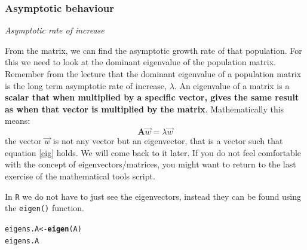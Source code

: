 \documentclass{article}\usepackage[]{graphicx}\usepackage[]{color}
\makeatletter
\newcommand{\hlstd}[1]{\textcolor[rgb]{0.345,0.345,0.345}{#1}}%
\newcommand{\hlkwb}[1]{\textcolor[rgb]{0.69,0.353,0.396}{#1}}%
\newcommand{\hlkwd}[1]{\textcolor[rgb]{0.737,0.353,0.396}{\textbf{#1}}}%
\newenvironment{kframe}{%
 \def\at@end@of@kframe{}%
 \ifinner\ifhmode%
  \def\at@end@of@kframe{\end{minipage}}%
  \begin{minipage}{\columnwidth}%
 \fi\fi%
 \def\FrameCommand##1{\hskip\@totalleftmargin \hskip-\fboxsep
 \colorbox{shadecolor}{##1}\hskip-\fboxsep
     \hskip-\linewidth \hskip-\@totalleftmargin \hskip\columnwidth}%
 \MakeFramed {\advance\hsize-\width
   \@totalleftmargin\z@ \linewidth\hsize
   \@setminipage}}%
 {\par\unskip\endMakeFramed%
 \at@end@of@kframe}
\newenvironment{knitrout}{}{} %
\makeatother
\begin{document}
\subsubsection{Asymptotic behaviour}
\textit{Asymptotic rate of increase} 

From the matrix, we can find the asymptotic growth rate of that population. For this we need to look at the dominant eigenvalue of the population matrix. Remember from the lecture that the dominant eigenvalue of a population matrix is the long term asymptotic rate of increase, $\lambda$. An eigenvalue of a matrix is a \textbf{scalar that when multiplied by a specific vector, gives the same result as when that vector is multiplied by the matrix}. Mathematically this means:
\begin{equation}\label{eig}
\boldsymbol{A} \vec{w}=\lambda \vec{w}
\end{equation}
the vector $\vec{w}$ is not any vector but an eigenvector, that is a vector such that equation \ref{eig} holds. We will come back to it later. If you do not feel comfortable with the concept of eigenvectors/matrices, you might want to return to the last exercise of the mathematical tools script.

In \texttt{R} we do not have to just see the eigenvectors, instead they can be found using the \texttt{eigen()} function.
\begin{knitrout}
\color{fgcolor}\begin{kframe}
\begin{alltt}
\hlstd{eigens.A}\hlkwb{<-}\hlkwd{eigen}\hlstd{(A)}
\hlstd{eigens.A}
\end{alltt}
\end{kframe}
\end{knitrout}
\end{document}
